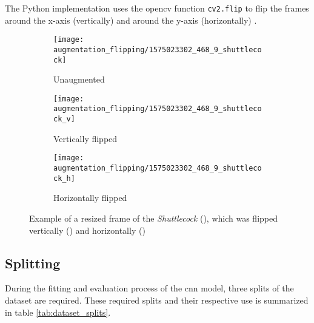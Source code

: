 The Python implementation uses the \acrshort{opencv} function \texttt{cv2.flip} to flip the frames around the x-axis (vertically) and around the y-axis (horizontally) \cite{training_opencv_flip}.

\begin{figure}
  \centering
  \begin{subfigure}[b]{0.3\textwidth}
    \centering
    \texttt{[image: augmentation\_flipping/1575023302\_468\_9\_shuttlecock]}
    \caption{Unaugmented}
    \label{subfig:af_resized}
  \end{subfigure}
  \begin{subfigure}[b]{0.3\textwidth}
    \centering
    \texttt{[image: augmentation\_flipping/1575023302\_468\_9\_shuttlecock\_v]}
    \caption{Vertically flipped}
    \label{subfig:af_vertical}
  \end{subfigure}
  \begin{subfigure}[b]{0.3\textwidth}
    \centering
    \texttt{[image: augmentation\_flipping/1575023302\_468\_9\_shuttlecock\_h]}
    \caption{Horizontally flipped}
    \label{subfig:af_horizontal}
  \end{subfigure}
  \caption{Example of a resized frame of the \textit{Shuttlecock} (), which was flipped vertically () and horizontally ()}
  \label{fig:augmentation_flipping}
\end{figure}










\subsection{Splitting}
\label{subsec:training_of_the_cnn:dataset:splitting}
During the fitting and evaluation process of the \acrshort{cnn} model, three splits of the dataset are required.
These required splits and their respective use is summarized in table \ref{tab:dataset_splits}.

